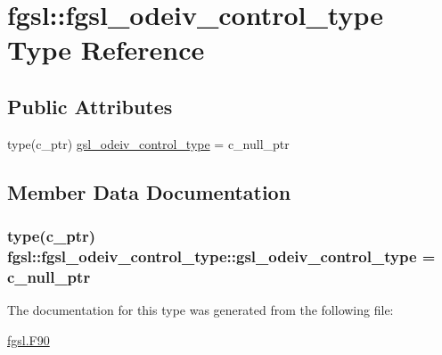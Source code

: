 \hypertarget{structfgsl_1_1fgsl__odeiv__control__type}{}\section{fgsl\+:\+:fgsl\+\_\+odeiv\+\_\+control\+\_\+type Type Reference}
\label{structfgsl_1_1fgsl__odeiv__control__type}
\subsection*{Public Attributes}
\begin{DoxyCompactItemize}
\item 
type(c\+\_\+ptr) \hyperlink{structfgsl_1_1fgsl__odeiv__control__type_aa6b9079ecc7b2e0b6d306501a41c6acd}{gsl\+\_\+odeiv\+\_\+control\+\_\+type} = c\+\_\+null\+\_\+ptr
\end{DoxyCompactItemize}


\subsection{Member Data Documentation}
\hypertarget{structfgsl_1_1fgsl__odeiv__control__type_aa6b9079ecc7b2e0b6d306501a41c6acd}{}
\subsubsection[{gsl\+\_\+odeiv\+\_\+control\+\_\+type}]{\setlength{\rightskip}{0pt plus 5cm}type(c\+\_\+ptr) fgsl\+::fgsl\+\_\+odeiv\+\_\+control\+\_\+type\+::gsl\+\_\+odeiv\+\_\+control\+\_\+type = c\+\_\+null\+\_\+ptr}\label{structfgsl_1_1fgsl__odeiv__control__type_aa6b9079ecc7b2e0b6d306501a41c6acd}


The documentation for this type was generated from the following file\+:\begin{DoxyCompactItemize}
\item 
\hyperlink{fgsl_8F90}{fgsl.\+F90}\end{DoxyCompactItemize}
